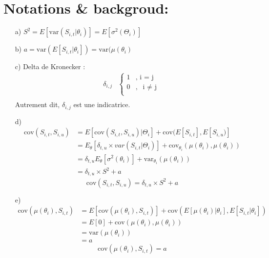 \section{Notations \& backgroud:}
\label{sec:4.1}
\begin{itemize}
\item[a)] $S^{2} = E[\text{var}(S_{i,t}|\theta_i)] = E[\sigma^2(\Theta_i)]$
\item[b)] $a= \text{var}(E[S_{i,t}|\theta_i]) = \text{var}(\mu(\theta_i)$
\item[c)] Delta de Kronecker : 
\begin{align*}
\delta_{i,j} & \left\{
     \begin{array}{rl}
      1 &, \text{ i = j}  \\
      0 &, \text{ i $\neq$ j} \\
     \end{array}
     \right. \\
\end{align*}
Autrement dit, $\delta_{i,j}$ est une indicatrice.
\item[d)] 
\begin{align*}
\text{cov}(S_{i,t}, S_{i,u}) &= E[\text{cov}(S_{i,t}, S_{i,u})|\Theta_i] + \text{cov}(E[S_{i,t}], E[S_{i,u})] \\
&= E_{\theta}[\delta_{t,u} \times var(S_{i,t}|\Theta_i)] + \text{cov}_{\theta_i}(\mu(\theta_i), \mu(\theta_i))\\
&= \delta_{t,u} E_{\theta}[ \sigma^2(\theta_i)] + \text{var}_{\theta_i}(\mu(\theta_i))\\
&= \delta_{t,u}\times S^2 + a 
\end{align*}
\begin{equation}
\label{eq:hypothed}
\text{cov}(S_{i,t},S_{i,u})= \delta_{t,u}\times S^2 + a 
\end{equation}
\item[e)]
\begin{align*}
\text{cov}(\mu(\theta_i), S_{i,t}) &= E[\text{cov}(\mu(\theta_i), S_{i,t})] + \text{cov}(E[\mu(\theta_i)|\theta_i], E[S_{i,t}|\theta_i]) \\
&= E[0] + \text{cov}(\mu(\theta_i), \mu(\theta_i))\\
&= \text{var}(\mu(\theta_i))\\
&= a
\end{align*}
\begin{equation}
\label{eq:hypothee}
\text{cov}(\mu(\theta_i),S_{i,t})=  a 
\end{equation}
\end{itemize}

